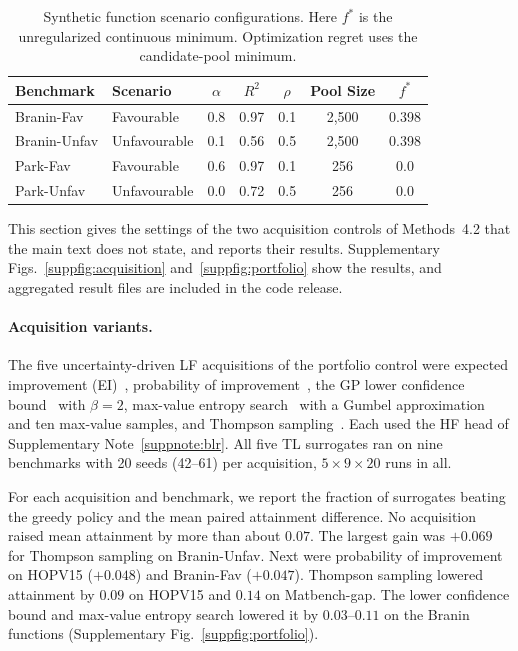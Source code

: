 \begin{table}[h]
\centering
\caption{Synthetic function scenario configurations. Here $f^*$ is the unregularized continuous minimum. Optimization regret uses the candidate-pool minimum.}
\label{supptab:synthetic_scenarios}
\begin{tabular}{llccccc}
\toprule
\textbf{Benchmark} & \textbf{Scenario} & $\alpha$ & $R^2$ & $\rho$ & \textbf{Pool Size} & $f^*$ \\
\midrule
Branin-Fav & Favourable & 0.8 & 0.97 & 0.1 & 2,500 & 0.398 \\
Branin-Unfav & Unfavourable & 0.1 & 0.56 & 0.5 & 2,500 & 0.398 \\
Park-Fav & Favourable & 0.6 & 0.97 & 0.1 & 256 & 0.0 \\
Park-Unfav & Unfavourable & 0.0 & 0.72 & 0.5 & 256 & 0.0 \\
\bottomrule
\end{tabular}
\end{table}



This section gives the settings of the two acquisition controls of Methods~4.2 that the main text does not state, and reports their results. Supplementary Figs.~\ref{suppfig:acquisition} and~\ref{suppfig:portfolio} show the results, and aggregated result files are included in the code release.

\paragraph{Acquisition variants.} The five uncertainty-driven LF acquisitions of the portfolio control were expected improvement (EI)~\citep{jones1998efficient}, probability of improvement~\citep{kushner1964new}, the GP lower confidence bound~\citep{srinivas2012information} with $\beta=2$, max-value entropy search~\citep{wang2017max} with a Gumbel approximation and ten max-value samples, and Thompson sampling~\citep{russo2018tutorial}. Each used the HF head of Supplementary Note~\ref{suppnote:blr}. All five TL surrogates ran on nine benchmarks with 20 seeds (42--61) per acquisition, $5 \times 9 \times 20$ runs in all.

For each acquisition and benchmark, we report the fraction of surrogates beating the greedy policy and the mean paired attainment difference. No acquisition raised mean attainment by more than about $0.07$. The largest gain was $+0.069$ for Thompson sampling on Branin-Unfav. Next were probability of improvement on HOPV15 ($+0.048$) and Branin-Fav ($+0.047$). Thompson sampling lowered attainment by $0.09$ on HOPV15 and $0.14$ on Matbench-gap. The lower confidence bound and max-value entropy search lowered it by $0.03$--$0.11$ on the Branin functions (Supplementary Fig.~\ref{suppfig:portfolio}).

